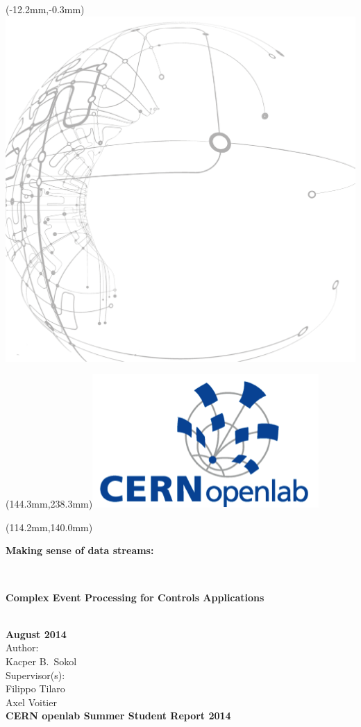 \documentclass[11pt, letterpaper]{article}            %
\begin{document}
\begin{textblock*}{0mm}(-12.2mm,-0.3mm)\noindent \includegraphics*{./gfx/bg.png}\end{textblock*}
\begin{textblock*}{0mm}(144.3mm,238.3mm)\noindent \includegraphics*{./gfx/openlab.png}\end{textblock*}
\begin{textblock*}{150mm}(114.2mm,140.0mm)\noindent
\parbox{8cm}{\bfseries\sffamily\textbf{\fontsize{20}{20}\selectfont\color{natc}Making sense of data streams:}}\\[.3em]
\parbox{8cm}{\bfseries\sffamily\textbf{\fontsize{20}{20}\selectfont\color{natc}Complex Event Processing for Controls Applications}}\\[36pt]
{\bfseries\sffamily\textbf{\fontsize{16}{20}\selectfont\color{natc}\motd August 2014}}\\[18pt]
{\sffamily\fontsize{14}{20}\selectfont\color{subc}Author:}\\
{\sffamily\fontsize{14}{20}\selectfont\color{subc}Kacper B.\ Sokol}\\[18pt]
{\sffamily\fontsize{14}{20}\selectfont\color{subc}Supervisor(s):}\\
{\sffamily\fontsize{14}{20}\selectfont\color{subc}Filippo Tilaro}\\
{\sffamily\fontsize{14}{20}\selectfont\color{subc}Axel Voitier}\\[18pt]
\textbf{\bfseries\sffamily\fontsize{11}{20}\selectfont\color{subc}CERN openlab Summer Student Report 2014}

\end{textblock*}
\end{document}
